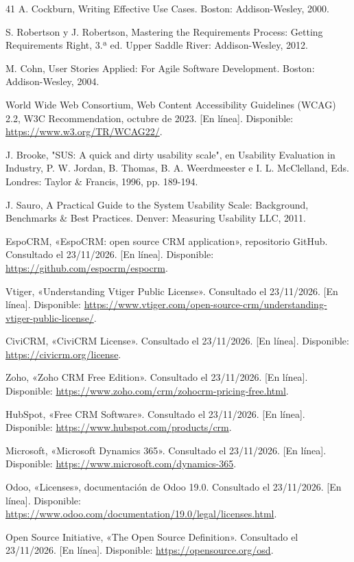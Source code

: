\begin{thebibliography}{41}
 A. Cockburn, Writing Effective Use Cases. Boston: Addison-Wesley, 2000.

 S. Robertson y J. Robertson, Mastering the Requirements Process: Getting Requirements Right, 3.ª ed. Upper Saddle River: Addison-Wesley, 2012.

 M. Cohn, User Stories Applied: For Agile Software Development. Boston: Addison-Wesley, 2004.

 World Wide Web Consortium, Web Content Accessibility Guidelines (WCAG) 2.2, W3C Recommendation, octubre de 2023. [En línea]. Disponible: \url{https://www.w3.org/TR/WCAG22/}.

 J. Brooke, "SUS: A quick and dirty usability scale", en Usability Evaluation in Industry, P. W. Jordan, B. Thomas, B. A. Weerdmeester e I. L. McClelland, Eds. Londres: Taylor \& Francis, 1996, pp. 189-194.

 J. Sauro, A Practical Guide to the System Usability Scale: Background, Benchmarks \& Best Practices. Denver: Measuring Usability LLC, 2011.

 EspoCRM, «EspoCRM: open source CRM application», repositorio GitHub. Consultado el 23/11/2026. [En línea]. Disponible: \url{https://github.com/espocrm/espocrm}.

 Vtiger, «Understanding Vtiger Public License». Consultado el 23/11/2026. [En línea]. Disponible: \url{https://www.vtiger.com/open-source-crm/understanding-vtiger-public-license/}.

 CiviCRM, «CiviCRM License». Consultado el 23/11/2026. [En línea]. Disponible: \url{https://civicrm.org/license}.

 Zoho, «Zoho CRM Free Edition». Consultado el 23/11/2026. [En línea]. Disponible: \url{https://www.zoho.com/crm/zohocrm-pricing-free.html}.

 HubSpot, «Free CRM Software». Consultado el 23/11/2026. [En línea]. Disponible: \url{https://www.hubspot.com/products/crm}.

 Microsoft, «Microsoft Dynamics 365». Consultado el 23/11/2026. [En línea]. Disponible: \url{https://www.microsoft.com/dynamics-365}.

 Odoo, «Licenses», documentación de Odoo 19.0. Consultado el 23/11/2026. [En línea]. Disponible: \url{https://www.odoo.com/documentation/19.0/legal/licenses.html}.

 Open Source Initiative, «The Open Source Definition». Consultado el 23/11/2026. [En línea]. Disponible: \url{https://opensource.org/osd}.


\end{thebibliography}
